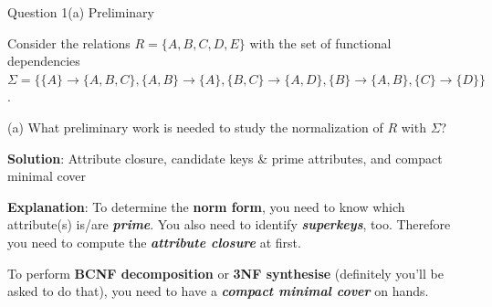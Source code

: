 \begin{frame}[fragile]{Question 1(a) Preliminary}

Consider the relations $R=\{A, B, C, D, E\}$ with the set of functional dependencies $\Sigma=\{\{A\} \rightarrow \{A, B, C\}, \{A, B\} \rightarrow \{A\}, \{B, C\} \rightarrow \{A, D\}, \{B\} \rightarrow \{A, B\}, \{C\} \rightarrow \{D\}\}$.\\\vspace{5pt}

(a) What preliminary work is needed to study the normalization of $R$ with $\Sigma$? \vspace{15pt}

\textbf{Solution}: Attribute closure, candidate keys \& prime attributes, and compact minimal cover\vspace{5pt}

\textbf{Explanation}: To determine the \textbf{norm form}, you need to know which attribute(s) is/are \textit{\textbf{prime}}. You also need to identify \textbf{\textit{superkeys}}, too. Therefore you need to compute the \textbf{\textit{attribute closure}} at first.\\\vspace{5pt}

To perform \textbf{BCNF decomposition} or \textbf{3NF synthesise} (definitely you'll be asked to do that), you need to have a \textbf{\textit{compact minimal cover}} on hands.

\end{frame}


